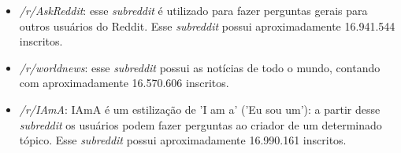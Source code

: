\begin{itemize}
  \item \textit{/r/AskReddit}: esse \textit{subreddit} é utilizado para fazer
  perguntas gerais para outros usuários do Reddit. Esse \textit{subreddit}
  possui aproximadamente 16.941.544 inscritos.
  \item \textit{/r/worldnews}: esse \textit{subreddit} possui as notícias de
  todo o mundo, contando com aproximadamente 16.570.606 inscritos.
  \item \textit{/r/IAmA}: IAmA é um estilização de 'I am a' ('Eu sou um'):
  a partir desse \textit{subreddit} os usuários podem fazer perguntas ao criador
  de um determinado tópico. Esse \textit{subreddit} possui aproximadamente
  16.990.161 inscritos.
\end{itemize}

% 


